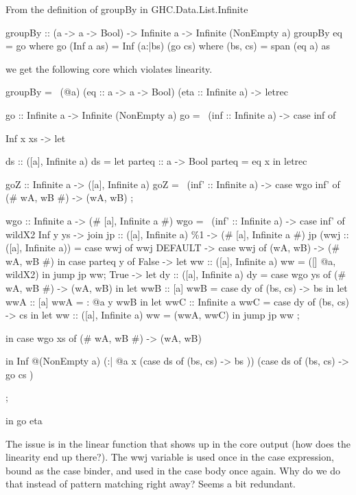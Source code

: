 \documentclass[a4paper, draft]{article}
\begin{document}
From the definition of groupBy in GHC.Data.List.Infinite
\begin{code}
groupBy :: (a -> a -> Bool) -> Infinite a -> Infinite (NonEmpty a)
groupBy eq = go
  where
    go (Inf a as) = Inf (a:|bs) (go cs)
      where (bs, cs) = span (eq a) as
\end{code}
we get the following core which violates linearity.
\begin{code}
groupBy = \ (@a) (eq :: a -> a -> Bool) (eta :: Infinite a) ->
  letrec {
    go :: Infinite a -> Infinite (NonEmpty a)
    go = \ (inf :: Infinite a) -> case inf of {
      Inf x xs -> let {
        ds :: ([a], Infinite a)
        ds = let {
            parteq :: a -> Bool
            parteq = eq x
        } in
          letrec {
            goZ :: Infinite a -> ([a], Infinite a)
            goZ = \ (inf' :: Infinite a) -> case wgo inf' of { (# wA, wB #) -> (wA, wB) };

            wgo :: Infinite a -> (# [a], Infinite a #)
            wgo = \ (inf' :: Infinite a) -> case inf' of wildX2 {
              Inf y ys ->
                join {
                    jp :: ([a], Infinite a) \%1 -> (# [a], Infinite a #)
                    jp (wwj :: ([a], Infinite a)) =
                        case wwj of wwj {
                            DEFAULT -> case wwj of { (wA, wB) -> (# wA, wB #) } }
                    } in
                      case parteq y of {
                        False ->
                            let {
                                ww :: ([a], Infinite a)
                                ww = ([] @a, wildX2)
                            } in jump jp ww;
                        True ->
                            let {
                                dy :: ([a], Infinite a)
                                dy = case wgo ys of { (# wA, wB #) -> (wA, wB)
                                }
                            } in
                                let {
                                    wwB :: [a]
                                    wwB = case dy of { (bs, cs) -> bs }
                                } in
                                    let {
                                        wwA :: [a]
                                        wwA = : @a y wwB
                                    } in let {
                                        wwC :: Infinite a
                                        wwC = case dy of { (bs, cs) -> cs }
                                    } in let {
                                        ww :: ([a], Infinite a)
                                        ww = (wwA, wwC)
                                    } in jump jp ww
                                }
              };
          } in
              case wgo xs of { (# wA, wB #) -> (wA, wB) }
      } in
          Inf @(NonEmpty a) (:| @a x (case ds of { (bs, cs) -> bs })) (case ds of { (bs, cs) -> go cs })
    };
  } in go eta
\end{code}
The issue is in the linear function that shows up in the core output (how does
the linearity end up there?). The wwj variable is used once in the case
expression, bound as the case binder, and used in the case body once again. Why
do we do that instead of pattern matching right away? Seems a bit redundant.
\end{document}
